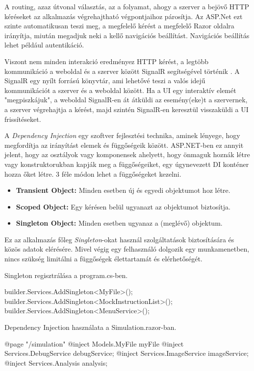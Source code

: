 A routing, azaz útvonal választás, az a folyamat, ahogy a szerver a bejövő HTTP kéréseket az alkalmazás végrehajtható végpontjaihoz párosítja. Az ASP.Net ezt szinte automatikusan teszi meg, a megfelelő kérést a megfelelő Razor oldalra irányítja, miután megadjuk neki a kellő navigációs beállítást. Navigációs beállítás lehet például autentikáció.

Viszont nem minden interakció eredményez HTTP kérést, a legtöbb kommunikáció a weboldal és a szerver között SignalR segítségével történik \cite{signalr}. A SignalR egy nyílt forrású könyvtár, ami lehetővé teszi a valós idejű kommunikációt a szerver és a weboldal között. Ha a UI egy interaktív elemét "megpiszkájuk", a weboldal SignalR-en át átküldi az esemény(eke)t a szervernek, a szerver végrehajtja a kérést, majd szintén SignalR-en keresztül visszaküldi a UI frissítéseket.

A \textit{Dependency Injection} \cite{di} egy szoftver fejlesztési technika, aminek lényege, hogy megfordítja az irányítást elemek és függőségeik között. ASP.NET-ben ez annyit jelent, hogy az osztályok vagy komponensek ahelyett, hogy önmaguk hoznák létre vagy konstruktorukban kapják meg a függőségeiket, egy úgynevezett DI konténer hozza őket létre. 3 féle módon lehet a függőségeket kezelni.	
\begin{itemize}
\item\textbf{Transient Object:} Minden esetben új és egyedi objektumot hoz létre.
\item\textbf{Scoped Object:} Egy kérésen belül ugyanazt az objektumot biztosítja.
\item\textbf{Singleton Object:} Minden esetben ugyanaz a (meglévő) objektum.
\end{itemize}
Ez az alkalmazás főleg \textit{Singleton}-okat használ szolgáltatások biztosítására és közös adatok elérésére. Mivel végig egy felhasználó dolgozik egy munkamenetben, nincs szükség limitálni a függőségek élettartamát és elérhetőségét.

Singleton regisztrálása a program.cs-ben.
\begin{cpp}
builder.Services.AddSingleton<MyFile>();
builder.Services.AddSingleton<MockInstructionList>();
builder.Services.AddSingleton<MenuService>();
\end{cpp}

Dependency Injection használata a Simulation.razor-ban.
\begin{cpp}
@page "/simulation"
@inject Models.MyFile myFile
@inject Services.DebugService debugService;
@inject Services.ImageService imageService;
@inject Services.Analysis analysis;
\end{cpp}


